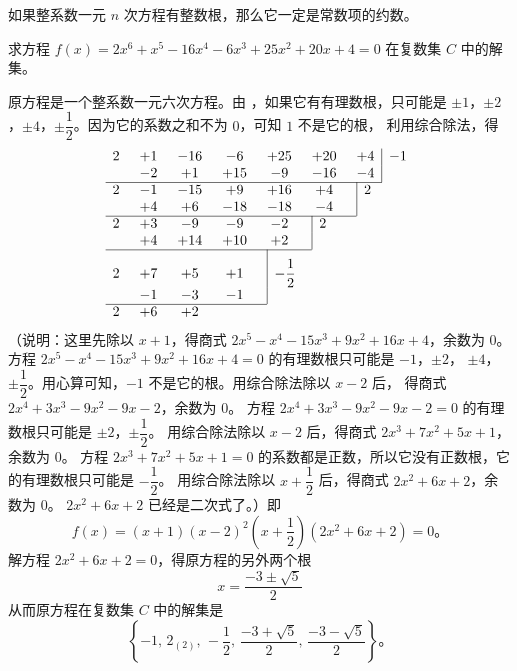 \begin{corollary} \label{corollary:yyncfc-3-2}
    如果整系数一元 $n$ 次方程有整数根，那么它一定是常数项的约数。
\end{corollary}

\liti 求方程 $f(x) = 2x^6 + x^5 - 16x^4 - 6x^3 + 25x^2 + 20x + 4 = 0$ 在复数集 $C$ 中的解集。

\jie 原方程是一个整系数一元六次方程。由 ，如果它有有理数根，只可能是
$\pm 1$，$\pm 2$，$\pm 4$，$\pm \dfrac{1}{2}$。因为它的系数之和不为 $0$，可知 $1$ 不是它的根，
利用综合除法，得
$$
\begin{array}{*{6}{c@{\hspace{0.5cm}}}c|l}
    2 & +1 & -16 &  -6 & +25 & +20 & +4 & -1 \\
      & -2 &  +1 & +15 &  -9 & -16 & -4 &    \\
    \cline{1-7}
    2 & -1 & -15 &  +9 & +16 &  +4 & \multicolumn{1}{|l}{ 2 } & \\
      & +4 &  +6 & -18 & -18 &  -4 & \multicolumn{1}{|l}{ }   & \\
    \cline{1-6}
    2 & +3 &  -9 &  -9 &  -2 &  \multicolumn{1}{|l}{ 2 } \\
      & +4 & +14 & +10 &  +2 &  \multicolumn{1}{|l}{   } \\
    \cline{1-5}
    2 & +7 &  +5 &  +1 & \multicolumn{1}{|l}{ -\dfrac{1}{2} } \rule{0pt}{2em} \\
      & -1 &  -3 &  -1 & \multicolumn{1}{|l}{ } \\
    \cline{1-4}
    2 & +6 & +2
\end{array}
$$
（说明：这里先除以 $x + 1$，得商式 $2x^5 - x^4 -15x^3 + 9x^2 + 16x + 4$，余数为 $0$。
方程 $2x^5 - x^4 -15x^3 + 9x^2 + 16x + 4 = 0$ 的有理数根只可能是 $-1$，$\pm 2$，
$\pm 4$，$\pm \dfrac{1}{2}$。用心算可知，$-1$ 不是它的根。用综合除法除以 $x - 2$ 后，
得商式 $2x^4 + 3x^3 -9x^2 -9x - 2$，余数为 $0$。
方程 $2x^4 + 3x^3 -9x^2 -9x - 2 = 0$ 的有理数根只可能是 $\pm 2$，$\pm \dfrac{1}{2}$。
用综合除法除以 $x - 2$ 后，得商式 $2x^3 + 7x^2 + 5x + 1$，余数为 $0$。
方程 $2x^3 + 7x^2 + 5x + 1 = 0$ 的系数都是正数，所以它没有正数根，它的有理数根只可能是 $-\dfrac{1}{2}$。
用综合除法除以 $x + \dfrac{1}{2}$ 后，得商式 $2x^2 + 6x + 2$，余数为 $0$。
$2x^2 + 6x + 2$ 已经是二次式了。）即
$$ f(x) = (x + 1) (x - 2)^2 \left( x + \dfrac{1}{2} \right) (2x^2 + 6x + 2) = 0 \text{。} $$
解方程 $2x^2 + 6x + 2 = 0$，得原方程的另外两个根
$$ x = \dfrac{-3 \pm \sqrt{5}}{2} $$
从而原方程在复数集 $C$ 中的解集是
$$ \left\{ -1,\, 2_{(2)},\, -\dfrac{1}{2},\, \dfrac{-3 + \sqrt{5}}{2},\, \dfrac{-3 - \sqrt{5}}{2} \right\} \text{。} $$



